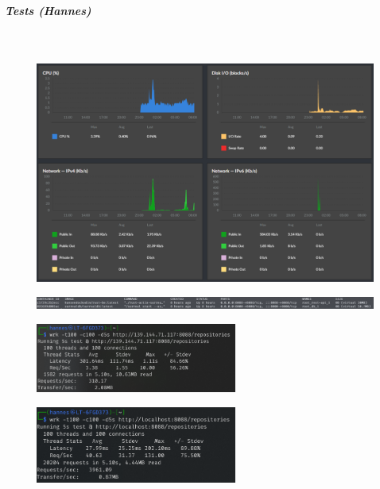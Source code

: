 \documentclass[notitlepage, hidelinks]{article}
\begin{document}
\subparagraph{Tests (Hannes)}  \mbox{} \\


\begin{figure}[H]
\centering
  \includegraphics[width=\textwidth]{images/data2.png}
  \caption{}
  \label{fig:benchmarkone}
\end{figure}


\begin{figure}[H]
\centering
  \includegraphics[width=\textwidth]{images/data4.png}
  \caption{}
  \label{fig:benchmarktwo}
\end{figure}


\begin{figure}[H]
\centering
  \includegraphics[width=250px]{images/data.png}
  \caption{}
  \label{fig:benchmarkthree}
\end{figure}


\begin{figure}[H]
\centering
  \includegraphics[width=250px]{images/data5.png}
  \caption{}
  \label{fig:benchmarkfour}
\end{figure}
\end{document}
